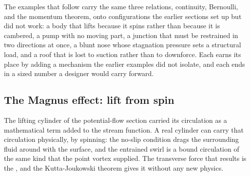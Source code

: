 The examples that follow carry the same three relations, continuity,
Bernoulli, and the momentum theorem, onto configurations the earlier
sections set up but did not work: a body that lifts because it spins
rather than because it is cambered, a pump with no moving part, a
junction that must be restrained in two directions at once, a blunt
nose whose stagnation pressure sets a structural load, and a roof that
is lost to suction rather than to downforce. Each earns its place by
adding a mechanism the earlier examples did not isolate, and each ends
in a sized number a designer would carry forward.

\subsection{The Magnus effect: lift from spin}

The lifting cylinder of the potential-flow section carried its
circulation as a mathematical term added to the stream function. A
real cylinder can carry that circulation physically, by spinning: the
no-slip condition drags the surrounding fluid around with the surface,
and the entrained swirl is a bound circulation of the same kind that
the point vortex supplied. The transverse force that results is the
, and the Kutta-Joukowski theorem gives it
without any new physics.



